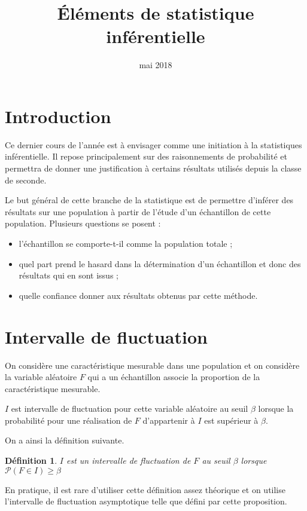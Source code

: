\documentclass[10pt,a4paper,french]{article}
\title{Éléments de statistique inférentielle}
\author{\bsc{Jumel}}
\date{mai 2018}
\makeatletter
\renewcommand{\maketitle}%
{\framebox{%
    \begin{minipage}{1.0\linewidth}%
      \begin{center}%
        \Large \@title ~-- \@author \\%
        \@date%
      \end{center}%
    \end{minipage}}%
  \normalsize%
}
\newcommand{\p}{\mathcal{P}}
\theoremstyle{break}
\newtheorem{definition}{Définition}
\theoremstyle{plain}
\theoremstyle{nonumberplain}
\theoremstyle{nonumberbreak}
\makeatother
\begin{document}
\noindent\maketitle


\section*{Introduction}

Ce dernier cours de l'année est à envisager comme une initiation à la
statistiques inférentielle. Il repose principalement sur des
raisonnements de probabilité et permettra de donner une justification à
certains résultats utilisés depuis la classe de seconde.

Le but général de cette branche de la statistique est de permettre
d'inférer des résultats sur une population à partir de l'étude d'un
échantillon de cette population. Plusieurs questions se posent :
\begin{itemize}
  \item l'échantillon se comporte-t-il comme la population totale ;
  \item quel part prend le hasard dans la détermination d'un échantillon
    et donc des résultats qui en sont issus ;
  \item quelle confiance donner aux résultats obtenus par cette méthode.
\end{itemize}

\section{Intervalle de fluctuation}

On considère une caractéristique mesurable dans une population et on
considère la variable aléatoire $F$ qui a un échantillon associe la
proportion de la caractéristique mesurable.

$I$ est intervalle de fluctuation pour cette variable aléatoire au seuil
$\beta$ lorsque la probabilité pour une réalisation de $F$ d'appartenir
à $I$ est supérieur à $\beta$.

On a ainsi la définition suivante.

\begin{definition}
  $I$ est un intervalle de fluctuation de $F$ au seuil $\beta$ lorsque
  $\p(F \in I) \geqslant \beta$
\end{definition}

En pratique, il est rare d'utiliser cette définition assez théorique et
on utilise l'intervalle de fluctuation asymptotique telle que défini par
cette proposition.
\end{document}
